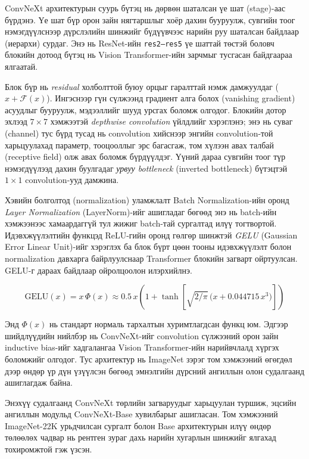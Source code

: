 ConvNeXt архитектурын суурь бүтэц нь дөрвөн шаталсан үе шат (stage)-аас бүрдэнэ. Үе шат бүр орон зайн нягтаршлыг хоёр дахин бууруулж, сувгийн тоог нэмэгдүүлснээр дүрслэлийн шинжийг бүдүүвчээс нарийн руу шаталсан байдлаар (иерархи) сурдаг. Энэ нь ResNet-ийн \texttt{res2--res5} үе шаттай төстэй боловч блокийн дотоод бүтэц нь Vision Transformer-ийн зарчмыг тусгасан байдгаараа ялгаатай.

Блок бүр нь \emph{residual} холболттой буюу орцыг гаралттай нэмж дамжуулдаг ($x + \mathcal{F}(x)$). Ингэснээр гүн сүлжээнд градиент алга болох (vanishing gradient) асуудлыг бууруулж, мэдээллийг шууд урсгах боломж олгодог. Блокийн дотор эхлээд $7\times7$ хэмжээтэй \emph{depthwise convolution} үйлдлийг хэрэглэнэ; энэ нь суваг (channel) тус бүрд тусад нь convolution хийснээр энгийн convolution-той харьцуулахад параметр, тооцооллыг эрс багасгаж, том хүлээн авах талбай (receptive field) олж авах боломж бүрдүүлдэг. Үүний дараа сувгийн тоог түр нэмэгдүүлээд дахин буулгадаг \emph{урвуу bottleneck} (inverted bottleneck) бүтэцтэй $1\times1$ convolution-ууд дамжина.

Хэвийн болголтод (normalization) уламжлалт Batch Normalization-ийн оронд \emph{Layer Normalization} (LayerNorm)-ийг ашигладаг бөгөөд энэ нь batch-ийн хэмжээнээс хамаардаггүй тул жижиг batch-тай сургалтад илүү тогтвортой. Идэвхжүүлэлтийн функцэд ReLU-гийн оронд гөлгөр шинжтэй \emph{GELU} (Gaussian Error Linear Unit)-ийг хэрэглэх ба блок бүрт цөөн тооны идэвхжүүлэлт болон normalization давхарга байрлуулснаар Transformer блокийн загварт ойртуулсан. GELU-г дараах байдлаар ойролцоолон илэрхийлнэ.

\begin{equation}
    \mathrm{GELU}(x) = x\,\Phi(x) \approx 0.5\,x\left(1 + \tanh\!\left[\sqrt{2/\pi}\,\bigl(x + 0.044715\,x^{3}\bigr)\right]\right)
    \label{eq:gelu}
\end{equation}

Энд $\Phi(x)$ нь стандарт нормаль тархалтын хуримтлагдсан функц юм. Эдгээр шийдлүүдийн нийлбэр нь ConvNeXt-ийг convolution сүлжээний орон зайн inductive bias-ийг хадгалангаа Vision Transformer-ийн нарийвчлалд хүргэх боломжийг олгодог. Тус архитектур нь ImageNet зэрэг том хэмжээний өгөгдөл дээр өндөр үр дүн үзүүлсэн бөгөөд эмнэлгийн дүрсний ангиллын олон судалгаанд ашиглагдаж байна.

Энэхүү судалгаанд ConvNeXt төрлийн загваруудыг харьцуулан туршиж, эцсийн ангиллын модульд ConvNeXt-Base хувилбарыг ашигласан. Том хэмжээний ImageNet-22K урьдчилсан сургалт болон Base архитектурын илүү өндөр төлөөлөх чадвар нь рентген зураг дахь нарийн хугарлын шинжийг ялгахад тохиромжтой гэж үзсэн.

